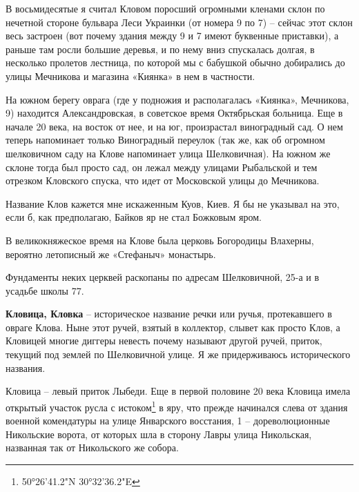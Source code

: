 
В восьмидесятые я считал Кловом поросший огромными кленами склон по нечетной стороне бульвара Леси Украинки (от номера 9 по 7) – сейчас этот склон весь застроен (вот почему здания между 9 и 7 имеют буквенные приставки), а раньше там росли большие деревья, и по нему вниз спускалась долгая, в несколько пролетов лестница, по которой мы с бабушкой обычно добирались до улицы Мечникова и магазина «Киянка» в нем в частности.

На южном берегу оврага (где у подножия и располагалась «Киянка», Мечникова, 9) находится Александровская, в советское время Октябрьская больница. Еще в начале 20 века, на восток от нее, и на юг, произрастал виноградный сад. О нем теперь напоминает только Виноградный переулок (так же, как об огромном шелковичном саду на Клове напоминает улица Шелковичная). На южном же склоне тогда был просто сад, он лежал между улицами Рыбальской и тем отрезком Кловского спуска, что идет от Московской улицы до Мечникова.

Название Клов кажется мне искаженным Куов, Киев. Я бы не указывал на это, если б, как предполагаю, Байков яр не стал Божковым яром.

В великокняжеское время на Клове была церковь Богородицы Влахерны, вероятно летописный же «Стефаныч» монастырь.

Фундаменты неких церквей раскопаны по адресам Шелковичной, 25-а и в усадьбе школы 77.\\ 

\medskip


\textbf{Кловица, Кловка} – историческое название речки или ручья, протекавшего в овраге Клова. Ныне этот ручей, взятый в коллектор, слывет как просто Клов, а Кловицей многие диггеры невесть почему называют другой ручей, приток, текущий под землей по Шелковичной улице. Я же придерживаюсь исторического названия.

Кловица – левый приток Лыбеди. Еще в первой половине 20 века Кловица имела открытый участок русла с истоком\footnote{50°26'41.2"N 30°32'36.2"E} в яру, что прежде начинался слева от здания военной комендатуры на улице Январского восстания, 1 – дореволюционные Никольские ворота, от которых шла в сторону Лавры улица Никольская, названная так от Никольского же собора.

